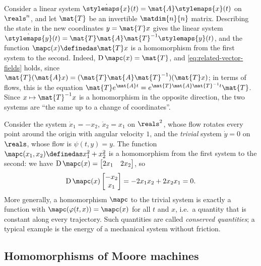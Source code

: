\begin{example}
    \label{exa:linear-change-of-coordinates}
    Consider a linear system $\dot{\stylemaps{x}}(t) = \mat{A}\stylemaps{x}(t)$ on $\reals^n$, and let $\mat{T}$ be an invertible $\matdim{n}{n}$ matrix.
    Describing the state in the new coordinates $y = \mat{T}x$ gives the linear system $\dot{\stylemaps{y}}(t) = \mat{T}\mat{A}\mat{T}^{-1}\stylemaps{y}(t)$, and the function $\mapc(x) \definedas \mat{T}x$ is a homomorphism from the first system to the second.
    Indeed, $\operatorname{D}\mapc(x) = \mat{T}$, and \cref{eq:related-vector-fields} holds, since $\mat{T}(\mat{A}x) = (\mat{T}\mat{A}\mat{T}^{-1})(\mat{T}x)$; in terms of flows, this is the equation $\mat{T}e^{\mat{A}t} = e^{\mat{T}\mat{A}\mat{T}^{-1}t}\mat{T}$.
    Since $x \mapsto \mat{T}^{-1}x$ is a homomorphism in the opposite direction, the two systems are ``the same up to a change of coordinates''.
\end{example}

\begin{example}
    \label{exa:conserved-quantity}
    Consider the system $\dot{x}_1 = -x_2$, $\dot{x}_2 = x_1$ on $\reals^2$, whose flow rotates every point around the origin with angular velocity $1$, and the \emph{trivial} system $\dot{y} = 0$ on $\reals$, whose flow is $\psi(t, y) = y$.
    The function $\mapc(x_1, x_2) \definedas x_1^2 + x_2^2$ is a homomorphism from the first system to the second: we have $\operatorname{D}\mapc(x) = \begin{bmatrix} 2x_1 & 2x_2 \end{bmatrix}$, so
    \begin{equation}
        \operatorname{D}\mapc(x) \begin{bmatrix} -x_2 \\ x_1 \end{bmatrix} = -2x_1x_2 + 2x_2x_1 = 0.
    \end{equation}
    More generally, a homomorphism $\mapc$ to the trivial system is exactly a function with $\mapc(\varphi(t, x)) = \mapc(x)$ for all $t$ and $x$, i.e.\ a quantity that is constant along every trajectory. Such quantities are called \emph{conserved quantities}; a typical example is the energy of a mechanical system without friction.
\end{example}


\subsection{Homomorphisms of Moore machines}
\label{sec:homomorphisms-moore}

